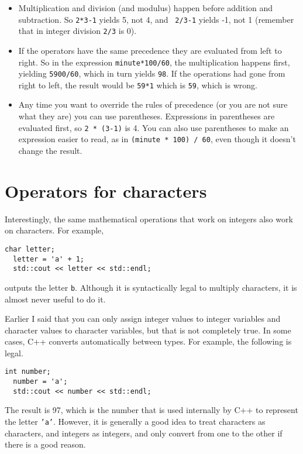 \begin{itemize}

\item Multiplication and division (and modulus) happen before
addition and subtraction.  So {\tt 2*3-1} yields 5, not 4, and {\tt
2/3-1} yields -1, not 1 (remember that in integer division {\tt 2/3}
is 0).

\item If the operators have the same precedence they are evaluated
from left to right.  So in the expression {\tt minute*100/60},
the multiplication happens first, yielding {\tt 5900/60}, which
in turn yields {\tt 98}.  If the operations had gone from right
to left, the result would be {\tt 59*1} which is {\tt 59}, which
is wrong.

\item Any time you want to override the rules of precedence (or
you are not sure what they are) you can use parentheses.  Expressions
in parentheses are evaluated first, so {\tt 2 * (3-1)} is 4.
You can also use parentheses to make an expression easier to
read, as in {\tt (minute * 100) / 60}, even though it doesn't
change the result.

\end{itemize}

\section{Operators for characters}

Interestingly, the same mathematical operations that work on
integers also work on characters.  For example,

\begin{lstlisting}[frame=single]
  char letter;
  letter = 'a' + 1;
  std::cout << letter << std::endl;
\end{lstlisting}
%
outputs the letter {\tt b}.  Although it is syntactically legal
to multiply characters, it is almost never useful to do it.

Earlier I said that you can only assign integer values to
integer variables and character values to character variables,
but that is not completely true.  In some cases, C++ converts
automatically between types.  For example, the following is
legal.

\begin{lstlisting}[frame=single]
  int number;
  number = 'a';
  std::cout << number << std::endl;
\end{lstlisting}
%
The result is 97, which is the number that is used internally
by C++ to represent the letter {\tt 'a'}.  However, it is
generally a good idea to treat characters as characters, and
integers as integers, and only convert from one to the other
if there is a good reason.

